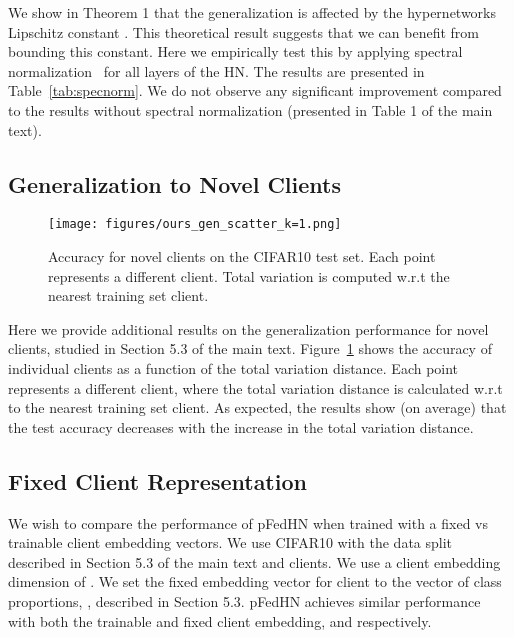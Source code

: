 \documentclass{article}
\newcommand\ourmethod{pFedHN}
\begin{document}
 We show in Theorem 1 that the generalization is affected by the hypernetworks Lipschitz constant . This theoretical result suggests that we can benefit from bounding this constant. Here we empirically test this by applying spectral normalization~\cite{spectral_normalization} for all layers of the HN. The results are presented in Table~\ref{tab:specnorm}. We do not observe any significant improvement compared to the results without spectral normalization (presented in Table 1 of the main text).






\subsection{Generalization to Novel Clients}

\begin{figure}[h]
    \centering
    \texttt{[image: figures/ours\_gen\_scatter\_k=1.png]}
    \caption{Accuracy for novel clients on the CIFAR10 test set. Each point represents a different client. Total variation is computed w.r.t the nearest training set client.}
    \label{fig:gen_raw}
\end{figure}

Here we provide additional results on the generalization performance for novel clients, studied in Section 5.3 of the main text. Figure~\ref{fig:gen_raw} shows the accuracy of individual clients as a function of the total variation distance. Each point represents a different client, where the total variation distance is calculated w.r.t to the nearest training set client. As expected, the results show (on average) that the test accuracy decreases with the increase in the total variation distance.

\subsection{Fixed Client Representation}

We wish to compare the performance of \ourmethod{} when trained with a fixed vs trainable client embedding vectors. We use CIFAR10 with the data split described in Section 5.3 of the main text and  clients. We use a client embedding dimension of . We set the fixed embedding vector for client  to the vector of class proportions, , described in Section 5.3. \ourmethod{} achieves similar performance with both the trainable and fixed client embedding,  and  respectively.
 
\end{document}
